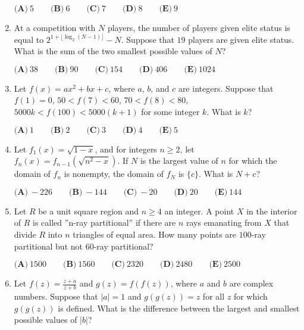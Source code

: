 \documentclass{article}
\begin{document}
\begin{enumerate}[label=\arabic*., itemsep=0.5em]
$
\textbf{(A)}\ 5 \qquad
\textbf{(B)}\ 6 \qquad
\textbf{(C)}\ 7 \qquad
\textbf{(D)}\ 8 \qquad
\textbf{(E)}\ 9 $\par \vspace{0.5em}\item At a competition with $N$ players, the number of players given elite status is equal to $2^{1+\lfloor \log_{2} (N-1) \rfloor}-N$. Suppose that $19$ players are given elite status. What is the sum of the two smallest possible values of $N$?

$
\textbf{(A)}\ 38 \qquad
\textbf{(B)}\ 90 \qquad
\textbf{(C)}\ 154 \qquad
\textbf{(D)}\ 406 \qquad
\textbf{(E)}\ 1024 $\par \vspace{0.5em}\item Let $f(x)=ax^2+bx+c$, where $a$, $b$, and $c$ are integers. Suppose that $f(1)=0$, $50<f(7)<60$, $70<f(8)<80$, $5000k<f(100)<5000(k+1)$ for some integer $k$. What is $k$?

$
\textbf{(A)}\ 1 \qquad
\textbf{(B)}\ 2 \qquad
\textbf{(C)}\ 3 \qquad
\textbf{(D)}\ 4 \qquad
\textbf{(E)}\ 5 $\par \vspace{0.5em}\item Let $f_{1}(x)=\sqrt{1-x}$, and for integers $n \geq 2$, let $f_{n}(x)=f_{n-1}(\sqrt{n^2 - x})$. If $N$ is the largest value of $n$ for which the domain of $f_{n}$ is nonempty, the domain of $f_{N}$ is $\{ c\}$. What is $N+c$?

$
\textbf{(A)}\ -226 \qquad
\textbf{(B)}\ -144 \qquad
\textbf{(C)}\ -20 \qquad
\textbf{(D)}\ 20 \qquad
\textbf{(E)}\ 144 $\par \vspace{0.5em}\item Let $R$ be a unit square region and $n \geq 4$ an integer. A point $X$ in the interior of $R$ is called ''n-ray partitional'' if there are $n$ rays emanating from $X$ that divide $R$ into $n$ triangles of equal area. How many points are $100$-ray partitional but not $60$-ray partitional?

$
\textbf{(A)}\ 1500 \qquad
\textbf{(B)}\ 1560 \qquad
\textbf{(C)}\ 2320 \qquad
\textbf{(D)}\ 2480 \qquad
\textbf{(E)}\ 2500 $\par \vspace{0.5em}\item Let $f(z)= \frac{z+a}{z+b}$ and $g(z)=f(f(z))$, where $a$ and $b$ are complex numbers. Suppose that $\left| a \right| = 1$ and $g(g(z))=z$ for all $z$ for which $g(g(z))$ is defined. What is the difference between the largest and smallest possible values of $\left| b \right|$?


\end{enumerate}
\end{document}
